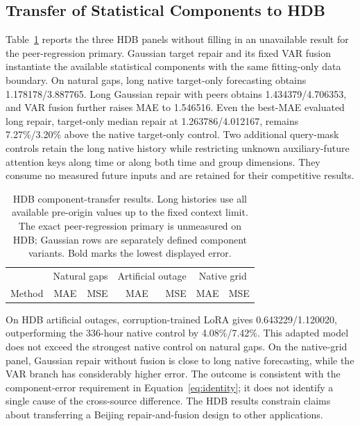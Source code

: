 \subsection{Transfer of Statistical Components to HDB}

Table~\ref{tab:hdb} reports the three HDB panels without filling in an unavailable result for the peer-regression primary. Gaussian target repair and its fixed VAR fusion instantiate the available statistical components with the same fitting-only data boundary. On natural gaps, long native target-only forecasting obtains 1.178178/3.887765. Long Gaussian repair with peers obtains 1.434379/4.706353, and VAR fusion further raises MAE to 1.546516. Even the best-MAE evaluated long repair, target-only median repair at 1.263786/4.012167, remains 7.27\%/3.20\% above the native target-only control. Two additional query-mask controls retain the long native history while restricting unknown auxiliary-future attention keys along time or along both time and group dimensions. They consume no measured future inputs and are retained for their competitive results.

\begin{table}[t]
\caption{HDB component-transfer results. Long histories use all available pre-origin values up to the fixed context limit. The exact peer-regression primary is unmeasured on HDB; Gaussian rows are separately defined component variants. Bold marks the lowest displayed error.}
\label{tab:hdb}
\centering\footnotesize
\setlength{\tabcolsep}{3.3pt}
\begin{tabular}{lrrrrrr}
\toprule
 & \multicolumn{2}{c}{Natural gaps} & \multicolumn{2}{c}{Artificial outage} & \multicolumn{2}{c}{Native grid}\\
Method & MAE & MSE & MAE & MSE & MAE & MSE\\
\midrule

\end{tabular}
\end{table}

On HDB artificial outages, corruption-trained LoRA gives 0.643229/1.120020, outperforming the 336-hour native control by 4.08\%/7.42\%. This adapted model does not exceed the strongest native control on natural gaps. On the native-grid panel, Gaussian repair without fusion is close to long native forecasting, while the VAR branch has considerably higher error. The outcome is consistent with the component-error requirement in Equation~\ref{eq:identity}; it does not identify a single cause of the cross-source difference. The HDB results constrain claims about transferring a Beijing repair-and-fusion design to other applications.

